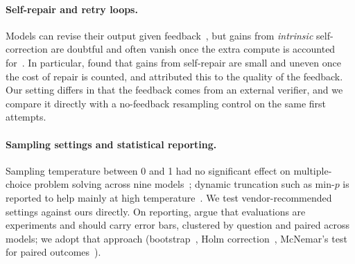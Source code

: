 \paragraph{Self-repair and retry loops.} Models can revise their output given feedback~\citep{madaan2023selfrefine,chen2024selfdebug}, but gains from \emph{intrinsic} self-correction are doubtful and often vanish once the
extra compute is accounted for~\citep{huang2024selfcorrect,olausson2024selfrepair}. In particular, \citet{olausson2024selfrepair} found that gains from self-repair are small and uneven once the cost of repair is counted, and attributed this to
the quality of the feedback. Our setting differs in that the feedback comes from an external verifier, and we compare it directly with a no-feedback resampling control on the same first attempts.

\paragraph{Sampling settings and statistical reporting.} Sampling temperature between 0 and 1 had no significant effect on multiple-choice problem solving across nine models~\citep{renze2024temperature}; dynamic truncation such as min-$p$ is
reported to help mainly at high temperature~\citep{nguyen2024minp}. We test vendor-recommended settings against ours directly. On reporting, \citet{miller2024errorbars} argue that evaluations are experiments and should carry error bars, clustered by question and
paired across models; we adopt that approach (bootstrap~\citep{efron1993bootstrap}, Holm correction~\citep{holm1979}, McNemar's test for paired outcomes~\citep{mcnemar1947}).
